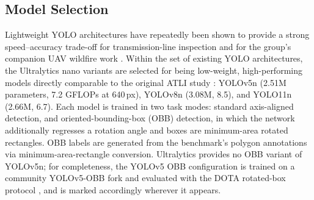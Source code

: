 \documentclass[conference]{IEEEtran}
\begin{document}
\subsection{Model Selection}
\label{sec:models}
Lightweight YOLO architectures have repeatedly been shown to provide a strong speed--accuracy trade-off for transmission-line inspection \cite{tsai2025atli,faisal2025powerline} and for the group's companion UAV wildfire work \cite{vazquez2024wildfire,vazquez2026wildfire}. Within the set of existing YOLO architectures, the Ultralytics nano variants \cite{jocher2023ultralytics} are selected for being low-weight, high-performing models directly comparable to the original ATLI study \cite{tsai2025atli}: YOLOv5n (2.51M parameters, 7.2 GFLOPs at 640\,px), YOLOv8n (3.08M, 8.5), and YOLO11n (2.66M, 6.7). Each model is trained in two task modes: standard axis-aligned detection, and oriented-bounding-box (OBB) detection, in which the network additionally regresses a rotation angle and boxes are minimum-area rotated rectangles. OBB labels are generated from the benchmark's polygon annotations via minimum-area-rectangle conversion. Ultralytics provides no OBB variant of YOLOv5n; for completeness, the YOLOv5 OBB configuration is trained on a community YOLOv5-OBB fork and evaluated with the DOTA rotated-box protocol \cite{xia2018dota}, and is marked accordingly wherever it appears.
\end{document}
